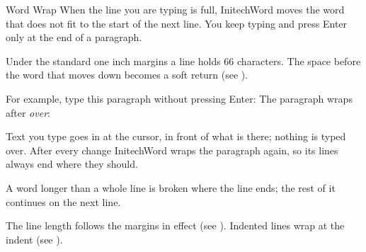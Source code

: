 \begin{Feature}{Word Wrap}
When the line you are typing is full, InitechWord moves the word that does
not fit to the start of the next line.  You keep typing and press Enter only
at the end of a paragraph.

Under the standard one inch margins a line holds 66 characters.  The space
before the word that moves down becomes a soft return (see ).

For example, type this paragraph without pressing Enter:
The paragraph wraps after \textit{over}:
\EndReplay

\Notes
{}
Text you type goes in at the cursor, in front of what is there; nothing is
typed over.  After every change InitechWord wraps the paragraph again, so
its lines always end where they should.

A word longer than a whole line is broken where the line ends; the rest of
it continues on the next line.

The line length follows the margins in effect (see ).  Indented lines wrap at the indent (see ).

\end{Feature}
